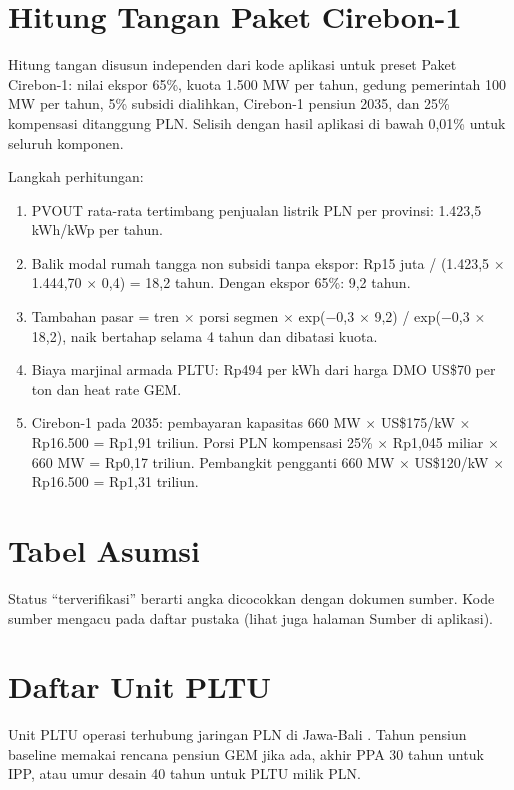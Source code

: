 \section{Hitung Tangan Paket Cirebon-1}
\label{app:hitung}

Hitung tangan disusun independen dari kode aplikasi untuk preset Paket Cirebon-1: nilai ekspor 65\%, kuota 1.500 MW per tahun, gedung pemerintah 100 MW per tahun, 5\% subsidi dialihkan, Cirebon-1 pensiun 2035, dan 25\% kompensasi ditanggung PLN. Selisih dengan hasil aplikasi di bawah 0,01\% untuk seluruh komponen.

\begin{table}[H]
\centering
\caption{Hitung tangan neraca PLN Paket Cirebon-1 terhadap baseline}
\small

\end{table}

Langkah perhitungan:
\begin{enumerate}
  \item PVOUT rata-rata tertimbang penjualan listrik PLN per provinsi: 1.423,5 kWh/kWp per tahun.
  \item Balik modal rumah tangga non subsidi tanpa ekspor: Rp15 juta / (1.423,5 $\times$ 1.444,70 $\times$ 0,4) = 18,2 tahun. Dengan ekspor 65\%: 9,2 tahun.
  \item Tambahan pasar = tren $\times$ porsi segmen $\times$ exp($-$0,3 $\times$ 9,2) / exp($-$0,3 $\times$ 18,2), naik bertahap selama 4 tahun dan dibatasi kuota.
  \item Biaya marjinal armada PLTU: Rp494 per kWh dari harga DMO US\$70 per ton dan heat rate GEM.
  \item Cirebon-1 pada 2035: pembayaran kapasitas 660 MW $\times$ US\$175/kW $\times$ Rp16.500 = Rp1,91 triliun. Porsi PLN kompensasi 25\% $\times$ Rp1,045 miliar $\times$ 660 MW = Rp0,17 triliun. Pembangkit pengganti 660 MW $\times$ US\$120/kW $\times$ Rp16.500 = Rp1,31 triliun.
\end{enumerate}

\section{Tabel Asumsi}
\label{app:asumsi}

Status ``terverifikasi'' berarti angka dicocokkan dengan dokumen sumber. Kode sumber mengacu pada daftar pustaka (lihat juga halaman Sumber di aplikasi).

{\small

}

\section{Daftar Unit PLTU}
\label{app:data}

Unit PLTU operasi terhubung jaringan PLN di Jawa-Bali \parencite{D-GEM-GCPT}. Tahun pensiun baseline memakai rencana pensiun GEM jika ada, akhir PPA 30 tahun untuk IPP, atau umur desain 40 tahun untuk PLTU milik PLN.

{\small

}
